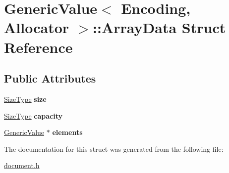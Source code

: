 \hypertarget{a00037}{}\section{Generic\+Value$<$ Encoding, Allocator $>$\+:\+:Array\+Data Struct Reference}
\label{a00037}
\subsection*{Public Attributes}
\begin{DoxyCompactItemize}
\item 
\hyperlink{a00677_a5ed6e6e67250fadbd041127e6386dcb5}{Size\+Type} {\bfseries size}\hypertarget{a00037_a5306856f64aea8ec53abf263ed2a35e2}{}\label{a00037_a5306856f64aea8ec53abf263ed2a35e2}

\item 
\hyperlink{a00677_a5ed6e6e67250fadbd041127e6386dcb5}{Size\+Type} {\bfseries capacity}\hypertarget{a00037_a0c6fe03c00e13d14b95abd31048aa1f5}{}\label{a00037_a0c6fe03c00e13d14b95abd31048aa1f5}

\item 
\hyperlink{a00130}{Generic\+Value} $\ast$ {\bfseries elements}\hypertarget{a00037_a86df976cb6f65924aca20eb9bd35553e}{}\label{a00037_a86df976cb6f65924aca20eb9bd35553e}

\end{DoxyCompactItemize}


The documentation for this struct was generated from the following file\+:\begin{DoxyCompactItemize}
\item 
\hyperlink{a00473}{document.\+h}\end{DoxyCompactItemize}
